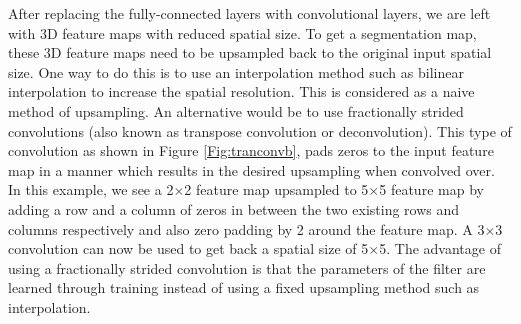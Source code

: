 After replacing the fully-connected layers with convolutional layers, we are left with 3D feature maps with reduced spatial size. To get a segmentation map, these 3D feature maps need to be upsampled back to the original input spatial size. One way to do this is to use an interpolation method such as bilinear interpolation to increase the spatial resolution. This is considered as a naive method of upsampling. An alternative would be to use fractionally strided convolutions (also known as transpose convolution or deconvolution). This type of convolution as shown in Figure \ref{Fig:tranconvb}, pads zeros to the input feature map in a manner which results in the desired upsampling when convolved over. In this example, we see a 2$\times$2 feature map upsampled to 5$\times$5 feature map by adding a row and a column of zeros in between the two existing rows and columns respectively and also zero padding by 2 around the feature map. A 3$\times$3 convolution can now be used to get back a spatial size of 5$\times$5. The advantage of using a fractionally strided convolution is that the parameters of the filter are learned through training instead of using a fixed upsampling method such as interpolation.
